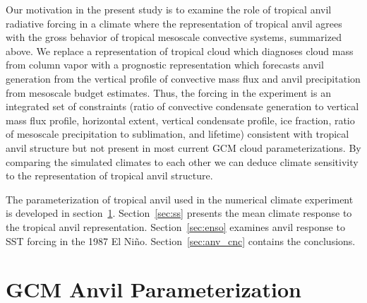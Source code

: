 \documentclass[twoside,agupp]{aguplus}
\begin{document}
Our motivation in the present study is to examine the role of
tropical anvil radiative forcing in a climate where the representation
of tropical anvil agrees with the gross behavior of tropical mesoscale
convective systems, summarized above.
We replace a representation of tropical cloud which diagnoses cloud
mass from column vapor with a prognostic representation which
forecasts anvil generation from the vertical profile of convective
mass flux and anvil precipitation from mesoscale budget estimates. 
Thus, the forcing in the experiment is an integrated set of
constraints (ratio of convective condensate generation to vertical
mass flux profile, horizontal extent, vertical condensate profile, ice
fraction, ratio of mesoscale precipitation to sublimation, and
lifetime) consistent with tropical anvil structure but not present in
most current GCM cloud parameterizations.
By comparing the simulated climates to each other we can deduce
climate sensitivity to the representation of tropical anvil
structure. 

The parameterization of tropical anvil used in the numerical climate
experiment is developed in section~\ref{sec:anv_mdl}.   
Section~\ref{sec:ss} presents the mean climate response to the
tropical anvil representation.
Section~\ref{sec:enso} examines anvil response to SST forcing in
the 1987 El Ni\~no. 
Section~\ref{sec:anv_cnc} contains the conclusions. 

\section{GCM Anvil Parameterization}\label{sec:anv_mdl}

\end{document}
